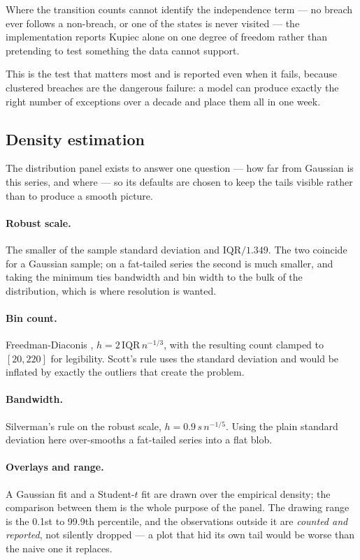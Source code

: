 Where the transition counts cannot identify the independence term --- no breach ever
follows a non-breach, or one of the states is never visited --- the implementation
reports Kupiec alone on one degree of freedom rather than pretending to test
something the data cannot support.

This is the test that matters most and is reported even when it fails, because
clustered breaches are the dangerous failure: a model can produce exactly the right
number of exceptions over a decade and place them all in one week.

\subsection{Density estimation}
\label{app:density}

The distribution panel exists to answer one question --- how far from Gaussian is this
series, and where --- so its defaults are chosen to keep the tails visible rather than
to produce a smooth picture.

\paragraph{Robust scale.} The smaller of the sample standard deviation and
$\mathrm{IQR}/1.349$. The two coincide for a Gaussian sample; on a fat-tailed series
the second is much smaller, and taking the minimum ties bandwidth and bin width to the
bulk of the distribution, which is where resolution is wanted.

\paragraph{Bin count.} Freedman-Diaconis \citep{freedman1981},
$h = 2\,\mathrm{IQR}\,n^{-1/3}$, with the resulting count clamped to $[20, 220]$ for
legibility. Scott's rule uses the standard deviation and would be inflated by exactly
the outliers that create the problem.

\paragraph{Bandwidth.} Silverman's rule \citep{silverman1986} on the robust scale,
$h = 0.9\,s\,n^{-1/5}$. Using the plain standard deviation here over-smooths a
fat-tailed series into a flat blob.

\paragraph{Overlays and range.} A Gaussian fit and a Student-$t$ fit are drawn over
the empirical density; the comparison between them is the whole purpose of the panel.
The drawing range is the 0.1st to 99.9th percentile, and the observations outside it
are \emph{counted and reported}, not silently dropped --- a plot that hid its own tail
would be worse than the naive one it replaces.


